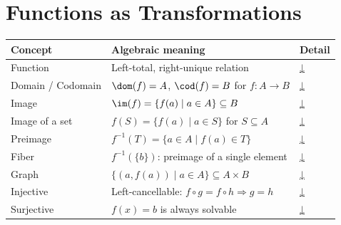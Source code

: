 
\section{Functions as Transformations}

\begin{tcolorbox}[colback=gray!6, colframe=gray!40, arc=2pt,
  left=6pt, right=6pt, top=4pt, bottom=4pt,
  title={\small\textbf{Functions — Algebraic Quick Reference}},
  fonttitle=\small\bfseries]
\small
\begin{tabular}{l l l}
\toprule
\textbf{Concept} & \textbf{Algebraic meaning} & \textbf{Detail} \\
\midrule
Function          & Left-total, right-unique relation                     & \hyperref[def:alg-function]{↓} \\
Domain / Codomain & $\dom(f) = A$,\; $\cod(f) = B$ for $f : A \to B$     & \hyperref[def:alg-function]{↓} \\
Image             & $\im(f) = \{f(a) \mid a \in A\} \subseteq B$         & \hyperref[def:alg-image]{↓} \\
Image of a set    & $f(S) = \{f(a) \mid a \in S\}$ for $S \subseteq A$   & \hyperref[def:alg-image]{↓} \\
Preimage          & $f^{-1}(T) = \{a \in A \mid f(a) \in T\}$            & \hyperref[def:alg-image]{↓} \\
Fiber             & $f^{-1}(\{b\})$: preimage of a single element         & \hyperref[def:alg-fiber]{↓} \\
Graph             & $\{(a, f(a)) \mid a \in A\} \subseteq A \times B$    & \hyperref[def:alg-graph]{↓} \\
Injective         & Left-cancellable: $f \circ g = f \circ h \Rightarrow g = h$ & \hyperref[def:alg-injective]{↓} \\
Surjective        & $f(x) = b$ is always solvable                        & \hyperref[def:alg-surjective]{↓} \\

\end{tabular}
\end{tcolorbox}
